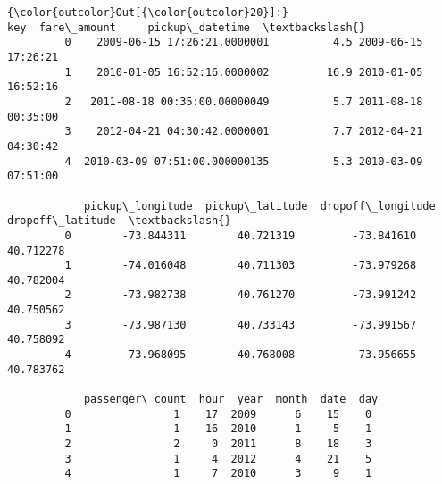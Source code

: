 \documentclass[11pt]{article}
\begin{document}
\begin{Verbatim}[commandchars=\\\{\}]
{\color{outcolor}Out[{\color{outcolor}20}]:}                              key  fare\_amount     pickup\_datetime  \textbackslash{}
         0    2009-06-15 17:26:21.0000001          4.5 2009-06-15 17:26:21   
         1    2010-01-05 16:52:16.0000002         16.9 2010-01-05 16:52:16   
         2   2011-08-18 00:35:00.00000049          5.7 2011-08-18 00:35:00   
         3    2012-04-21 04:30:42.0000001          7.7 2012-04-21 04:30:42   
         4  2010-03-09 07:51:00.000000135          5.3 2010-03-09 07:51:00   
         
            pickup\_longitude  pickup\_latitude  dropoff\_longitude  dropoff\_latitude  \textbackslash{}
         0        -73.844311        40.721319         -73.841610         40.712278   
         1        -74.016048        40.711303         -73.979268         40.782004   
         2        -73.982738        40.761270         -73.991242         40.750562   
         3        -73.987130        40.733143         -73.991567         40.758092   
         4        -73.968095        40.768008         -73.956655         40.783762   
         
            passenger\_count  hour  year  month  date  day  
         0                1    17  2009      6    15    0  
         1                1    16  2010      1     5    1  
         2                2     0  2011      8    18    3  
         3                1     4  2012      4    21    5  
         4                1     7  2010      3     9    1  
\end{Verbatim}
            
\end{document}
